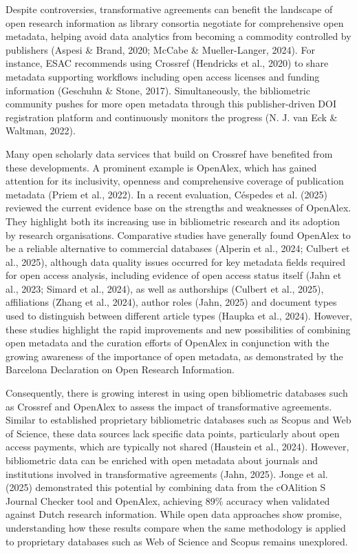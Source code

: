 \documentclass[a4paper,man,floatsintext,longtable,noextraspace,10pt]{apa6}
\begin{document}
Despite controversies, transformative agreements can benefit the
landscape of open research information as library consortia negotiate
for comprehensive open metadata, helping avoid data analytics from
becoming a commodity controlled by publishers (Aspesi \& Brand, 2020;
McCabe \& Mueller-Langer, 2024). For instance, ESAC recommends using
Crossref (Hendricks et al., 2020) to share metadata supporting workflows
including open access licenses and funding information (Geschuhn \&
Stone, 2017). Simultaneously, the bibliometric community pushes for more
open metadata through this publisher-driven DOI registration platform
and continuously monitors the progress (N. J. van Eck \& Waltman, 2022).

Many open scholarly data services that build on Crossref have benefited
from these developments. A prominent example is OpenAlex, which has
gained attention for its inclusivity, openness and comprehensive
coverage of publication metadata (Priem et al., 2022). In a recent
evaluation, Céspedes et al. (2025) reviewed the current evidence base on
the strengths and weaknesses of OpenAlex. They highlight both its
increasing use in bibliometric research and its adoption by research
organisations. Comparative studies have generally found OpenAlex to be a
reliable alternative to commercial databases (Alperin et al., 2024;
Culbert et al., 2025), although data quality issues occurred for key
metadata fields required for open access analysis, including evidence of
open access status itself (Jahn et al., 2023; Simard et al., 2024), as
well as authorships (Culbert et al., 2025), affiliations (Zhang et al.,
2024), author roles (Jahn, 2025) and document types used to distinguish
between different article types (Haupka et al., 2024). However, these
studies highlight the rapid improvements and new possibilities of
combining open metadata and the curation efforts of OpenAlex in
conjunction with the growing awareness of the importance of open
metadata, as demonstrated by the Barcelona Declaration on Open Research
Information.

Consequently, there is growing interest in using open bibliometric
databases such as Crossref and OpenAlex to assess the impact of
transformative agreements. Similar to established proprietary
bibliometric databases such as Scopus and Web of Science, these data
sources lack specific data points, particularly about open access
payments, which are typically not shared (Haustein et al., 2024).
However, bibliometric data can be enriched with open metadata about
journals and institutions involved in transformative agreements (Jahn,
2025). Jonge et al. (2025) demonstrated this potential by combining data
from the cOAlition S Journal Checker tool and OpenAlex, achieving 89\%
accuracy when validated against Dutch research information. While open
data approaches show promise, understanding how these results compare
when the same methodology is applied to proprietary databases such as
Web of Science and Scopus remains unexplored.
\end{document}
